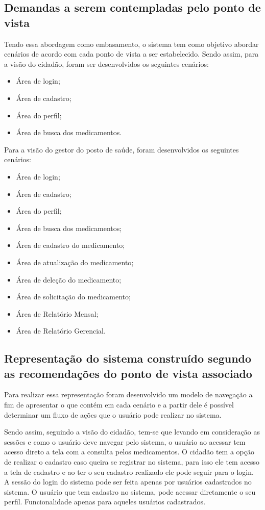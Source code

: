\subsection{Demandas a serem contempladas pelo ponto de vista}

Tendo essa abordagem como embasamento, o sistema tem como objetivo abordar cenários de acordo com cada ponto de vista a ser estabelecido. Sendo assim, para a visão do cidadão, foram ser desenvolvidos os seguintes cenários:
\begin{itemize}
    \item Área de login;
    \item Área de cadastro;
    \item Área do perfil;
    \item Área de busca dos medicamentos.
\end{itemize}

Para a visão do gestor do posto de saúde, foram desenvolvidos os seguintes cenários:

\begin{itemize}
    \item Área de login;
    \item Área de cadastro;
    \item Área do perfil;
    \item Área de busca dos medicamentos;
    \item Área de cadastro do medicamento;
    \item Área de atualização do medicamento;
    \item Área de deleção do medicamento;
    \item Área de solicitação do medicamento;
    \item Área de Relatório Mensal;
    \item Área de Relatório Gerencial.
\end{itemize}

\subsection{Representação do sistema construído segundo as recomendações do ponto de vista associado}

Para realizar essa representação foram desenvolvido um modelo de navegação a fim de apresentar o que contém em cada cenário e a partir dele é possível determinar um fluxo de ações que o usuário pode realizar no sistema. 

Sendo assim, seguindo a visão do cidadão, tem-se que levando em consideração as sessões e como o usuário deve navegar pelo sistema, o usuário ao acessar tem acesso direto a tela com a consulta pelos medicamentos.
O cidadão tem a opção de realizar o cadastro caso queira se registrar no sistema, para isso ele tem acesso a tela de cadastro e ao ter o seu cadastro realizado ele pode seguir para o login.
A sessão do login do sistema pode ser feita apenas por usuários cadastrados no sistema. 
O usuário que tem cadastro no sistema, pode acessar diretamente o seu perfil. Funcionalidade apenas para aqueles usuários cadastrados.

